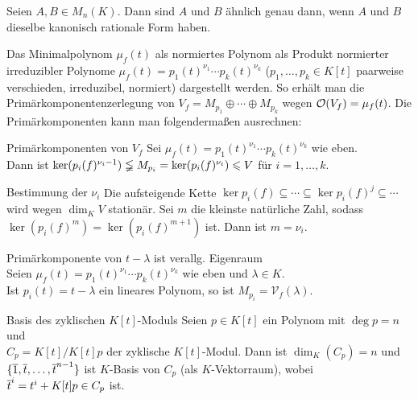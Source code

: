 \begin{Kor}
    Seien $A, B \in M_n(K)$.
    Dann sind $A$ und $B$ ähnlich genau dann, wenn $A$ und $B$ dieselbe
    kanonisch rationale Form haben.
\end{Kor}

\begin{Bem}
    Das Minimalpolynom $\mu_f(t)$ als normiertes Polynom als Produkt normierter
    irreduzibler Polynome $\mu_f(t) = p_1(t)^{\nu_1} \dotsm p_k(t)^{\nu_k}$
    ($p_1, \dotsc, p_k \in K[t]$ paarweise verschieden, irreduzibel, normiert)
    dargestellt werden.
    So erhält man die Primärkomponentenzerlegung von
    $V_f = M_{p_1} \oplus \dotsb \oplus M_{p_k}$
    wegen $\mathcal{O}(V_f) = \mu_f(t)$.
    Die Primärkomponenten kann man folgendermaßen ausrechnen:
\end{Bem}

\begin{Satz}{Primärkomponenten von $V_f$}
    Sei $\mu_f(t) = p_1(t)^{\nu_1} \dotsm p_k(t)^{\nu_k}$ wie eben. \\
    Dann ist $\ker(p_i(f)^{\nu_i-1}) \lneqq M_{p_i} =
    \ker(p_i(f)^{\nu_i}) \leqslant V$ für $i = 1, \dotsc, k$.
\end{Satz}

\begin{Satz}{Bestimmung der $\nu_i$}
    Die aufsteigende Kette
    $\ker p_i(f) \subseteq \dotsb \subseteq \ker p_i(f)^j \subseteq \dotsb$
    wird wegen $\dim_K V$ stationär.
    Sei $m$ die kleinste natürliche Zahl, sodass
    $\ker(p_i(f)^m) = \ker(p_i(f)^{m+1})$ ist.
    Dann ist $m = \nu_i$.
\end{Satz}

\begin{Lemma}{Primärkomponente von $t - \lambda$ ist verallg. Eigenraum}\\
    Seien $\mu_f(t) = p_1(t)^{\nu_1} \dotsm p_k(t)^{\nu_k}$ wie eben
    und $\lambda \in K$. \\
    Ist $p_i(t) = t - \lambda$ ein lineares Polynom,
    so ist $M_{p_i} = \mathcal{V}_f(\lambda)$.
\end{Lemma}

\begin{Satz}{Basis des zyklischen $K[t]$-Moduls}
    Seien $p \in K[t]$ ein Polynom mit $\deg p = n$ und \\
    $C_p = K[t]/K[t]p$ der zyklische $K[t]$-Modul.
    Dann ist $\dim_K(C_p) = n$ und $\{\overline{1}, \overline{t}, \dotsc, \overline{t}^{n-1}\}$
    ist $K$-Basis von $C_p$ (als $K$-Vektorraum), wobei
    $\overline{t}^i = t^i + K[t]p \in C_p$ ist.
\end{Satz}

